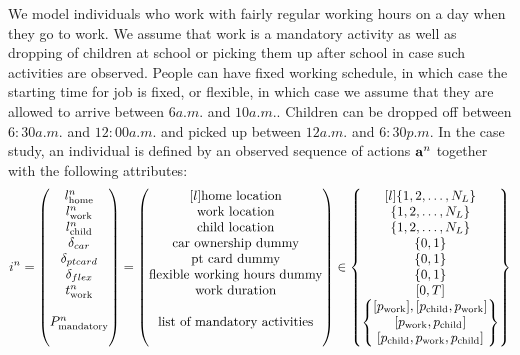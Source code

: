 We model individuals who work with fairly regular working hours on a day when they go to work. We assume that work is a mandatory activity as well as dropping of children at school or picking them up after school in case such activities are observed. People can have fixed working schedule, in which case the starting time for job is fixed, or flexible, in which case we assume that they are allowed to arrive between $6\unit{a.m.}$ and $10\unit{a.m.}$.
Children can be dropped off between $6:30\unit{a.m.}$ and $12:00\unit{a.m.}$ and picked up between $12\unit{a.m.}$ and $6:30\unit{p.m.}$
In the case study, an individual is defined by an observed sequence of actions ${\bf a}^n$ together with the following attributes:
\begin{equation}
i^n = 
\begin{pmatrix}
l^n_\text{home} \\
l^n_\text{work} \\
l^n_\text{child} \\
\dummy{car} \\
\dummy{pt card} \\
\dummy{flex} \\
t^n_\text{work}\\
\\
P^n_{\text{mandatory}}
\\
\text {}
\end{pmatrix} = 
\begin{pmatrix*}[l]
\text{home location} \\
\text{work location} \\
\text{child location} \\
\text{car ownership dummy} \\
\text{pt card dummy} \\
\text{flexible working hours dummy} \\
\text{work duration} \\
\\
\text{list of mandatory activities}
\\
\text {}
\end{pmatrix*}
\in
\begin{Bmatrix*}[l]
\{1,2,\dots, N_L\} \\
\{1,2,\dots, N_L\} \\
\{1,2,\dots, N_L\} \\
\{0,1\} \\
\{0,1\} \\
\{0,1\} \\
[0,T] \\
\begin{Bmatrix*} [\p{work}] ,[\p{child},\p{work}] \\  
[\p{work},\p{child}] 
\\ [\p{child},\p{work},\p{child}]\end{Bmatrix*}
\end{Bmatrix*}
\end{equation}
